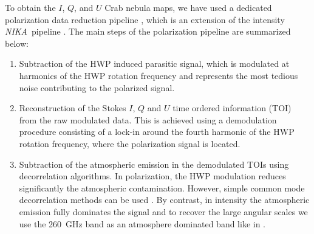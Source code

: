 \documentclass[twocolumn,traditabstract]{aa}
\def\NIKA{\textit{NIKA}}
\begin{document}
To obtain the $I$, $Q$, and $U$ Crab nebula maps, we have used a dedicated
polarization data reduction pipeline \citep{ritacco2017}, which is an extension
of the intensity \NIKA\ pipeline \citep{catalano2014,adam2013}. The main steps
of the polarization pipeline are summarized below:
\begin{enumerate}
\item  Subtraction of the HWP induced parasitic signal, which is modulated at harmonics of the HWP rotation frequency and represents the most tedious noise contributing to the polarized signal. 
\item Reconstruction of the Stokes $I$, $Q$ and $U$ time ordered information (TOI) from the raw modulated data. This is achieved using a demodulation procedure consisting of a lock-in around the fourth harmonic of the HWP rotation frequency, where the polarization signal is located.
\item Subtraction of the atmospheric emission in the demodulated TOIs using
  decorrelation algorithms. In polarization, the HWP modulation reduces
  significantly the atmospheric contamination. However, simple common mode
  decorrelation methods can be used \citep{ritacco2017}. By contrast, in
  intensity the atmospheric emission fully dominates the signal and to recover
  the large angular scales we use the 260~GHz band as an atmosphere
  dominated band like in \cite{adam2013}.



\end{enumerate}
\end{document}
